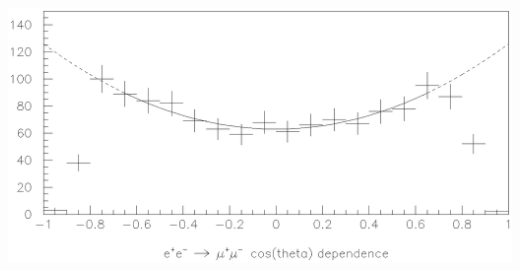 \begin{slide*}
\begin{minipage}[t]{\linewidth}
\begin{minipage}{\linewidth}
\begin{center}
\begin{minipage}{\linewidth}
\begin{center}
	\includegraphics[width=\linewidth]{mupair_costh.eps}
      \end{center}
    \end{minipage}
  \end{center}
\end{minipage}

\end{minipage}
\end{slide*}


